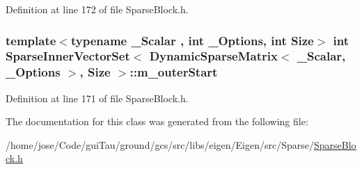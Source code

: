 Definition at line 172 of file Sparse\-Block.\-h.

\hypertarget{class_sparse_inner_vector_set_3_01_dynamic_sparse_matrix_3_01___scalar_00_01___options_01_4_00_01_size_01_4_ae47f8e9fa90a7fcb101a41a401540716}{
\subsubsection[{m\-\_\-outer\-Start}]{\setlength{\rightskip}{0pt plus 5cm}template$<$typename \-\_\-\-Scalar , int \-\_\-\-Options, int Size$>$ {\bf int} {\bf Sparse\-Inner\-Vector\-Set}$<$ {\bf Dynamic\-Sparse\-Matrix}$<$ \-\_\-\-Scalar, \-\_\-\-Options $>$, Size $>$\-::m\-\_\-outer\-Start\hspace{0.3cm}{\ttfamily [protected]}}}\label{class_sparse_inner_vector_set_3_01_dynamic_sparse_matrix_3_01___scalar_00_01___options_01_4_00_01_size_01_4_ae47f8e9fa90a7fcb101a41a401540716}


Definition at line 171 of file Sparse\-Block.\-h.



The documentation for this class was generated from the following file\-:\begin{DoxyCompactItemize}
\item 
/home/jose/\-Code/gui\-Tau/ground/gcs/src/libs/eigen/\-Eigen/src/\-Sparse/\hyperlink{_sparse_block_8h}{Sparse\-Block.\-h}\end{DoxyCompactItemize}

